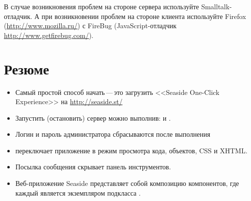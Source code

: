 \documentclass[a4paper,10pt,twoside]{book}
\begin{document}
В случае возникновения проблем на стороне сервера используйте
Smalltalk-отладчик. А при возникновении проблем на стороне клиента
используйте Firefox (\url{http://www.mozilla.ru/}) с FireBug (JavaScript-отладчик
\url{http://www.getfirebug.com/}). 


\section{Резюме}

\begin{itemize}
\item Самый простой способ начать\,---\,это загрузить <<Seaside One-Click
Experience>> на \url{http://seaside.st/} 
\item Запустить (остановить) сервер можно выполнив:
 и .
\item Логин и пароль администратора сбрасываются после выполнения 
\item {} переключает приложение в режим просмотра
кода, объектов, CSS и XHTML.
\item Посылка сообщения 
скрывает панель инструментов.
\item Веб-приложение Seaside представляет собой композицию компонентов,
где каждый является экземпляром подкласса .

\end{itemize}
\end{document}
